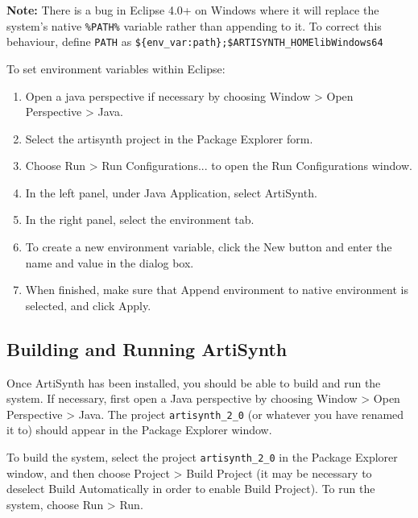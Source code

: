 \documentclass{article}
\begin{document}
\begin{sideblock}
{\bf Note:} There is a bug in Eclipse 4.0+ on Windows where it will replace 
the system's native {\tt \%PATH\%} variable rather than appending to it.  
To correct this behaviour, define {\tt PATH} as 
{\tt \$\{env\_var:path\};\$ARTISYNTH\_HOME\BKS lib\BKS Windows64} 
\end{sideblock}

To set environment variables within Eclipse:

\begin{enumerate}

\item Open a java perspective if necessary by choosing
  {\sf Window > Open Perspective > Java}.

\item Select the artisynth project in the {\sf Package Explorer} form.

\item Choose {\sf Run > Run Configurations...} to open the {\sf Run
  Configurations} window.

\item In the left panel, under {\sf Java Application}, select {\sf ArtiSynth}.

\item In the right panel, select the {\sf environment} tab.

\item To create a new environment variable, click the {\sf New} button and
  enter the name and value in the dialog box.

\item When finished, make sure that {\sf Append environment to native
  environment} is selected, and click {\sf Apply}.

\end{enumerate}

\subsection{Building and Running ArtiSynth}
\label{BuildingAndRunningArtisynthSec}

Once ArtiSynth has been installed, you should be able to build and run
the system. If necessary, first open a Java perspective by choosing
{\sf Window > Open Perspective > Java}. The project {\tt artisynth\_2\_0} (or
whatever you have renamed it to) should appear in the {\sf Package
Explorer} window.

To build the system, select the project {\tt artisynth\_2\_0} in the
{\sf Package Explorer} window, and then choose {\sf Project > Build Project}
(it may be necessary to deselect {\sf Build Automatically} in order to
enable {\sf Build Project}).  To run the system, choose {\sf Run > Run}.
\end{document}
